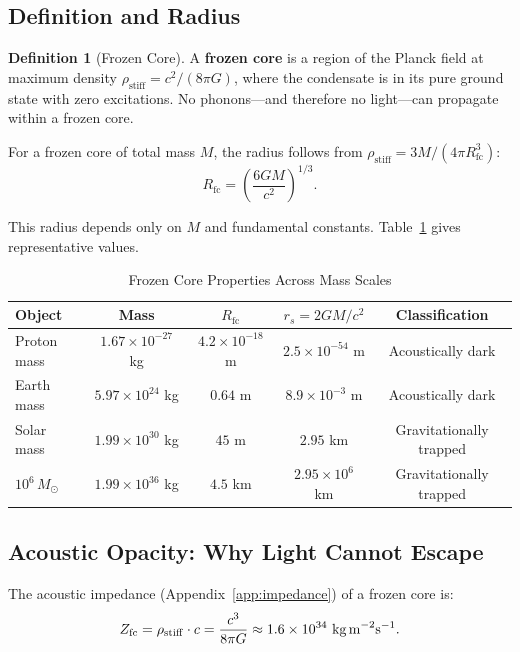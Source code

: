 \documentclass[11pt,a4paper]{article}
\newcommand{\rhostiff}{\ensuremath{\rho_{\mathrm{stiff}}}}
\theoremstyle{definition}
\newtheorem{definition}[theorem]{Definition}
\theoremstyle{remark}
\begin{document}
\subsection{Definition and Radius}
\label{sec:frozen_core_def}

\begin{definition}[Frozen Core]
A \textbf{frozen core} is a region of the Planck field at maximum density $\rhostiff = c^2/(8\pi G)$, where the condensate is in its pure ground state with zero excitations. No phonons---and therefore no light---can propagate within a frozen core.
\end{definition}

For a frozen core of total mass $M$, the radius follows from $\rhostiff = 3M/(4\pi R_{\mathrm{fc}}^3)$:
\begin{equation}
\label{eq:frozen_core_radius}
\boxed{R_{\mathrm{fc}} = \left(\frac{6GM}{c^2}\right)^{1/3}.}
\end{equation}

This radius depends only on $M$ and fundamental constants. Table~\ref{tab:frozen_cores} gives representative values.

\begin{table}[H]
\centering
\caption{Frozen Core Properties Across Mass Scales}
\label{tab:frozen_cores}
\begin{tabular}{@{}lcccc@{}}
\toprule
\textbf{Object} & \textbf{Mass} & $R_{\mathrm{fc}}$ & $r_s = 2GM/c^2$ & \textbf{Classification} \\
\midrule
Proton mass & $1.67 \times 10^{-27}$ kg & $4.2 \times 10^{-18}$ m & $2.5 \times 10^{-54}$ m & Acoustically dark \\
Earth mass & $5.97 \times 10^{24}$ kg & $0.64$ m & $8.9 \times 10^{-3}$ m & Acoustically dark \\
Solar mass & $1.99 \times 10^{30}$ kg & $45$ m & $2.95$ km & Gravitationally trapped \\
$10^6\,M_\odot$ & $1.99 \times 10^{36}$ kg & $4.5$ km & $2.95 \times 10^{6}$ km & Gravitationally trapped \\
\bottomrule
\end{tabular}
\end{table}

\subsection{Acoustic Opacity: Why Light Cannot Escape}
\label{sec:acoustic_opacity}

The acoustic impedance (Appendix~\ref{app:impedance}) of a frozen core is:
\begin{equation}
Z_{\mathrm{fc}} = \rhostiff \cdot c = \frac{c^3}{8\pi G} \approx 1.6 \times 10^{34} \text{ kg\,m}^{-2}\text{s}^{-1}.
\end{equation}
\end{document}
